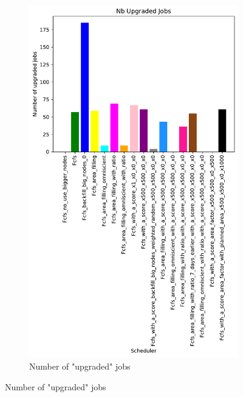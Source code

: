 \documentclass[a4paper]{article}
\begin{document}
\begin{figure}[H]
\begin{subfigure}[b]{0.4\linewidth}\centering\includegraphics[width=0.7\linewidth]{MBSS/plot/Results_Size_And_Data_2022-02-02->2022-02-03_V9532_Nb_Upgraded_Jobs_450_128_32_256_4_1024.pdf}\caption{Number of "upgraded" jobs}\label{45}\end{subfigure}

\end{figure}
\end{document}
